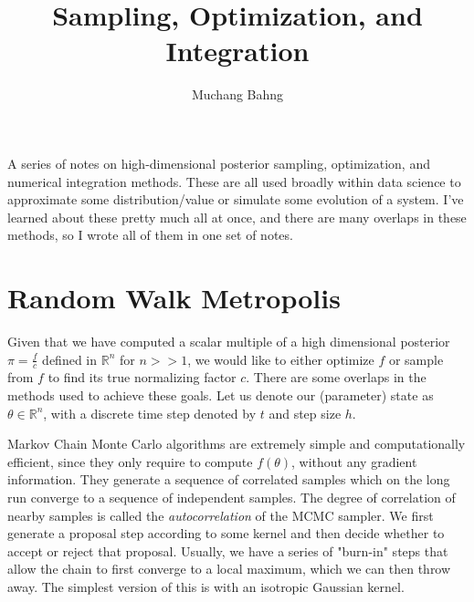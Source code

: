 \documentclass{article}
\theoremstyle{remark}
\theoremstyle{definition}
\begin{document}
\pagestyle{fancy}

\cfoot{\thepage / \pageref{LastPage}}

\title{Sampling, Optimization, and Integration}
\author{Muchang Bahng}

\maketitle

A series of notes on high-dimensional posterior sampling, optimization, and numerical integration methods. These are all used broadly within data science to approximate some distribution/value or simulate some evolution of a system. I've learned about these pretty much all at once, and there are many overlaps in these methods, so I wrote all of them in one set of notes. 



\section{Random Walk Metropolis}
Given that we have computed a scalar multiple of a high dimensional posterior $\pi = \frac{f}{c}$ defined in $\mathbb{R}^n$ for $n >> 1$, we would like to either optimize $f$ or sample from $f$ to find its true normalizing factor $c$. There are some overlaps in the methods used to achieve these goals. Let us denote our (parameter) state as $\theta \in \mathbb{R}^n$, with a discrete time step denoted by $t$ and step size $h$. 

Markov Chain Monte Carlo algorithms are extremely simple and computationally efficient, since they only require to compute $f(\theta)$, without any gradient information. They generate a sequence of correlated samples which on the long run converge to a sequence of independent samples. The degree of correlation of nearby samples is called the \textit{autocorrelation} of the MCMC sampler. We first generate a proposal step according to some kernel and then decide whether to accept or reject that proposal. Usually, we have a series of "burn-in" steps that allow the chain to first converge to a local maximum, which we can then throw away. The simplest version of this is with an isotropic Gaussian kernel. 
\end{document}
